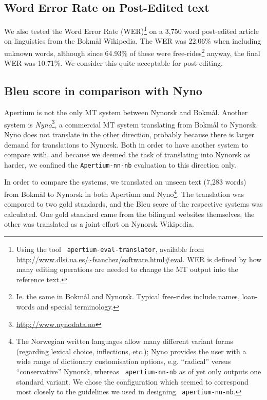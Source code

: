 \documentclass[11pt]{article}
\newcommand{\comment}[1]{\textbf{SKRIV} {\it #1}}
\renewcommand{\comment}[1]{}
\begin{document}
\subsection{Word Error Rate on Post-Edited text}
\label{sec:WER}
We also tested the Word Error Rate (WER)\footnote{Using the tool {\tt
    \small apertium-eval-translator}, available from
  \href{http://www.dlsi.ua.es/~fsanchez/software.html\#eval}{http://www.dlsi.ua.es/\~{}fsanchez/software.html\#eval}. WER
  is defined by how many editing operations are needed to change the
  MT output into the reference text.}
on a 3,750 word post-edited
article on linguistics from the Bokmål Wikipedia. The WER was 22.06\%
when including unknown words, although since 64.93\% of these were
free-rides\footnote{Ie. the same in Bokmål and Nynorsk. Typical
  free-rides include names, loan-words and special terminology.}
anyway, the final WER was 10.71\%. We consider this quite acceptable
for post-editing.

\comment{More WER explanation? Levenshtein/Edit distance, substitution/insertion/deletion? Or a citation instead?}

\subsection{{\sc Bleu} score in comparison with Nyno}

Apertium is not the only MT system between Nynorsk and Bokmål. Another
system is
\textit{Nyno}\footnote{\href{http://www.nynodata.no}{http://www.nynodata.no}},
a commercial MT system translating from Bokmål to Nynorsk. Nyno does not 
translate in the other direction, probably because there is larger demand for 
translations to Nynorsk. Both in order to have another system to compare with, 
and because we deemed the task of translating into Nynorsk as harder, we
confined the {\tt \small Apertium-nn-nb} evaluation to this direction only.

In order to compare the systems, we translated an unseen text (7,283
words) from Bokmål to Nynorsk in both Apertium and Nyno\footnote{The
  Norwegian written languages allow many different variant forms
  (regarding lexical choice, inflections, etc.); Nyno provides the
  user with a wide range of dictionary customisation options,
  e.g. ``radical'' versus ``conservative'' Nynorsk, whereas {\tt \small 
    apertium-nn-nb} as of yet only outputs one standard variant. We
  chose the \comment{standard/XYZ-}configuration which seemed to
  correspond most closely to the guidelines we used in designing {\tt \small 
    apertium-nn-nb}.}. The translation was compared to two gold
standards, and the {\sc Bleu} score \citep{papineni2001bleu} of the
respective systems was calculated. One gold standard came from the
bilingual websites themselves, the other was translated as a joint 
effort on Nynorsk Wikipedia.
\end{document}
